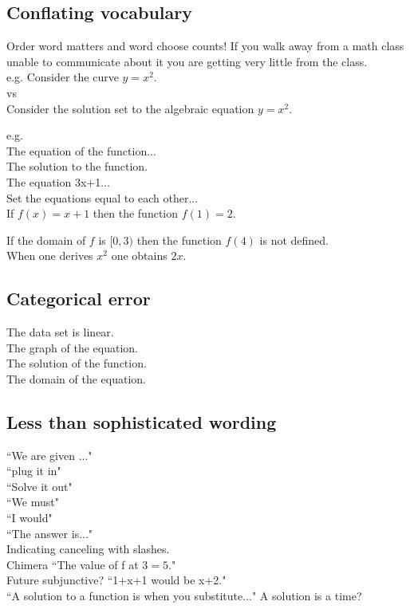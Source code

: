 \documentclass[12pt]{article}
\def\noi{\noindent}
\begin{document}
\subsection{Conflating vocabulary}
Order word matters and word choose counts! If you walk away from a math class unable to communicate about it you are getting very little from the class.  \\

e.g. 
Consider the curve $y=x^2$.\\
vs\\
Consider the solution set to the algebraic equation $y=x^2$.

\noi e.g. \\
The equation of the function...\\

\noi The solution to the function.\\

\noi The equation 3x+1...\\

\noi Set the equations equal to each other... \\

\noi If $f(x)=x+1$ then the function $f(1)=2$.

\noi If the domain of $f$ is $[0,3)$ then the function $f(4)$ is not defined.\\

\noi When one derives $x^2$ one obtains $2x$.

\subsection{Categorical error}

The data set is linear. \\

The graph of the equation.\\

The solution of the function. \\

The domain of the equation. \\


\subsection{Less than sophisticated wording}
``We are given ..."\\
``plug it in"\\
``Solve it out"\\
``We must"\\
``I would" \\
``The answer is..."\\
Indicating canceling with slashes.\\
Chimera ``The value of f at $3= 5$."\\
Future subjunctive? ``1+x+1 would be x+2." \\
``A solution to a function is when you substitute..." A solution is a time? \\ 
\end{document}
